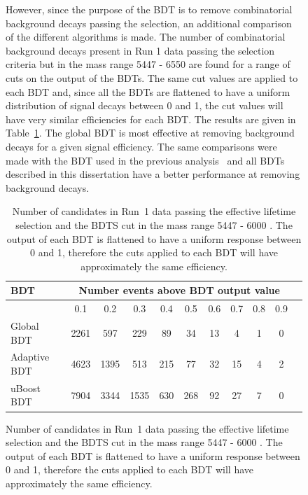 \begin{figure}[tbp]
However, since the purpose of the BDT is to remove combinatorial background decays passing the \bsmumu selection, an additional comparison of the different algorithms is made. The number of combinatorial background decays present in Run 1 data passing the \el selection criteria but in the mass range 5447 - 6550 \mevcc are found for a range of cuts on the output of the BDTs. %
The same cut values are applied to each BDT and, since all the BDTs are flattened to have a uniform distribution of signal decays between 0 and 1, the cut values will have very similar efficiencies for each BDT. %
The results are given in Table~\ref{tab:bkgdsC}. The global BDT is most effective at removing background decays for a given signal efficiency.
The same comparisons were made with the BDT used in the previous analysis~\cite{CMS:2014xfa} and all BDTs described in this dissertation have a better performance at removing background decays. 




\begin{table}[htbp]
\begin{center}
\begin{tabular}{l|cccccccccc}
\hline
BDT & \multicolumn{9}{c}{Number events above BDT output value}  \\
\hline
   & 0.1 & 0.2 & 0.3 & 0.4 & 0.5 & 0.6 & 0.7 & 0.8 & 0.9 \\ \hline
Global BDT  & 2261 & 597 & 229 & 89 & 34 & 13 & 4 & 1 & 0 \\ 
Adaptive BDT  & 4623 & 1395 & 513 & 215 & 77 & 32 & 15 & 4 & 2 \\
uBoost BDT & 7904 & 3344 & 1535 &630 & 268 & 92 & 27 & 7 & 0 \\
\hline
\end{tabular}
\vspace{0.7cm}
\vspace{0.7cm}
\caption{Number of candidates in Run~1 data passing the effective lifetime selection and the BDTS cut in the mass range 5447 - 6000 \mevcc. The output of each BDT is flattened to have a uniform response between 0 and 1, therefore the cuts applied to each BDT will have approximately the same efficiency.}
\label{tab:bkgdsC}
\end{center}
\vspace{-1.0cm}
\end{table}



\end{figure}
